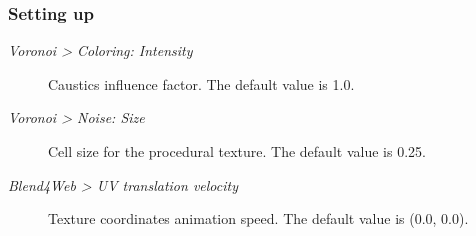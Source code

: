 \documentclass[a4paper,12pt,oneside]{sphinxmanual}
\begin{document}
\subsubsection{Setting up}
\label{outdoor_rendering:id16}\begin{figure}[htbp]
\centering

\end{figure}
\begin{description}
\item[{\emph{Voronoi \textgreater{} Coloring: Intensity}}] \leavevmode
Caustics influence factor. The default value is 1.0.

\item[{\emph{Voronoi \textgreater{} Noise: Size}}] \leavevmode
Cell size for the procedural texture. The default value is 0.25.

\item[{\emph{Blend4Web \textgreater{} UV translation velocity}}] \leavevmode
Texture coordinates animation speed. The default value is (0.0, 0.0).

\end{description}
\end{document}
